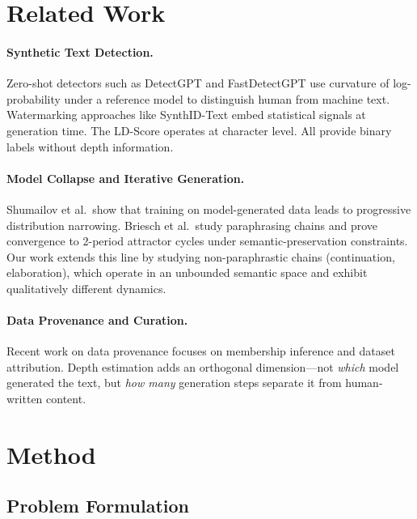 \documentclass[letterpaper,11pt]{article}
\begin{document}
\section{Related Work}
\label{sec:related}

\paragraph{Synthetic Text Detection.}
Zero-shot detectors such as DetectGPT \cite{mitchell2023detectgpt} and FastDetectGPT \cite{bao2024fastdetectgpt} use curvature of log-probability under a reference model to distinguish human from machine text. Watermarking approaches like SynthID-Text embed statistical signals at generation time. The LD-Score \cite{tulchinskii2024ldscore} operates at character level. All provide binary labels without depth information.

\paragraph{Model Collapse and Iterative Generation.}
Shumailov et al.\ show that training on model-generated data leads to progressive distribution narrowing. Briesch et al.\ study paraphrasing chains and prove convergence to 2-period attractor cycles under semantic-preservation constraints. Our work extends this line by studying non-paraphrastic chains (continuation, elaboration), which operate in an unbounded semantic space and exhibit qualitatively different dynamics.

\paragraph{Data Provenance and Curation.}
Recent work on data provenance focuses on membership inference and dataset attribution. Depth estimation adds an orthogonal dimension---not \emph{which} model generated the text, but \emph{how many} generation steps separate it from human-written content.

\section{Method}
\label{sec:method}

\subsection{Problem Formulation}
\end{document}
